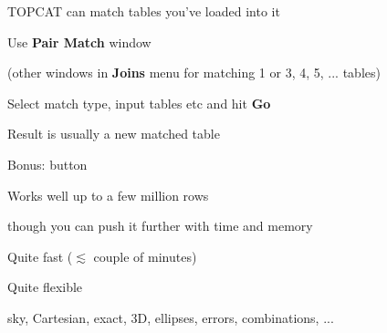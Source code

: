 \documentclass[20pt,landscape]{foils}
\newcommand{\buttimg}[1]
           {\mbox{\vtop{\vskip-2ex\hbox{\texttt{[image: \#1]}}}}}
\begin{document}
\begin{list0}
  \item TOPCAT can match tables you've loaded into it
  \begin{list2big}
    \item Use \buttimg{matchTwo2.png} {\bf Pair Match} window
    \begin{list3}
      \item (other windows in {\bf Joins} menu for
             matching 1 or 3, 4, 5, ... tables)
    \end{list3}
    \item Select match type, input tables etc and hit {\bf Go}
    \item Result is usually a new matched table
    \item Bonus: \buttimg{plotbutt1.png} button
  \end{list2big}
  \item Works well up to a few million rows
  \begin{list2big}
    \item though you can push it further with time and memory
  \end{list2big}
  \item Quite fast ($\lesssim$ couple of minutes)
  \item Quite flexible
  \begin{list2big}
    \item sky, Cartesian, exact, 3D, ellipses, errors, combinations, ...
  \end{list2big}
\end{list0}

\end{document}

